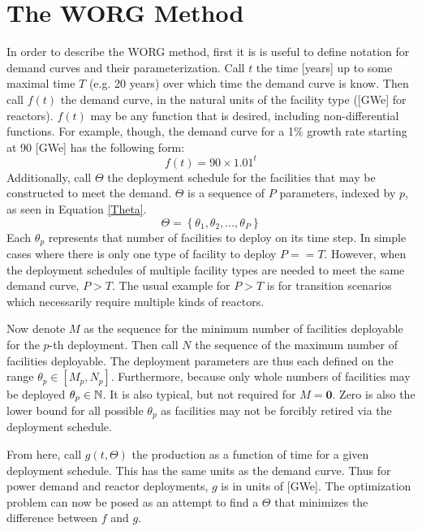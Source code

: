 \section{The WORG Method}
\label{method}

In order to describe the WORG method, first it is is useful to define  
notation for demand curves and their parameterization.  Call $t$ the time
[years] up to some maximal time $T$ (e.g. 20 years) over which time the
demand curve is know.  Then call $f(t)$ the demand curve, in the natural 
units of the facility type ([GWe] for reactors).
$f(t)$ may be any function that is desired, including non-differential 
functions. For example, though, the demand curve for a 1\% growth rate 
starting at 90 [GWe] has the following form:
\begin{equation}
\label{f-1}
f(t) = 90\times 1.01^t
\end{equation}
Additionally, call $\Theta$ the deployment schedule for the facilities that 
may be constructed to meet the demand.
$\Theta$ is a sequence of $P$ parameters, indexed by $p$, as seen in 
Equation \ref{Theta}.
\begin{equation}
\label{Theta}
\Theta = \left\{\theta_1, \theta_2, \ldots, \theta_P\right\}
\end{equation}
Each $\theta_p$ represents that number of facilities to deploy on its
time step. In simple cases where there is only one type of facility
to deploy $P == T$.  However, when the deployment schedules of multiple 
facility types are needed to meet the same demand curve, $P > T$.  The usual
example for $P > T$ is for transition scenarios which necessarily require 
multiple kinds of reactors.

Now denote $M$ as the sequence for the minimum number of facilities deployable
for the $p$-th deployment. Then call $N$ the sequence of the maximum number
of facilities deployable. The deployment parameters are thus each defined
on the range $\theta_p \in [M_p, N_p]$. Furthermore, because only whole
numbers of facilities may be deployed $\theta_p \in \mathbb{N}$.  It is also typical, 
but not required for $M = \mathbf{0}$. Zero is also the lower bound
for all possible $\theta_p$ as facilities may not be forcibly retired via the
deployment schedule.

From here, call $g(t, \Theta)$ the production as a function of time for a
given deployment schedule. This has the same units as the demand curve.
Thus for power demand and reactor deployments, $g$ is in units of [GWe]. The 
optimization problem can now be posed as an attempt to find a $\Theta$
that minimizes the difference between $f$ and $g$.




